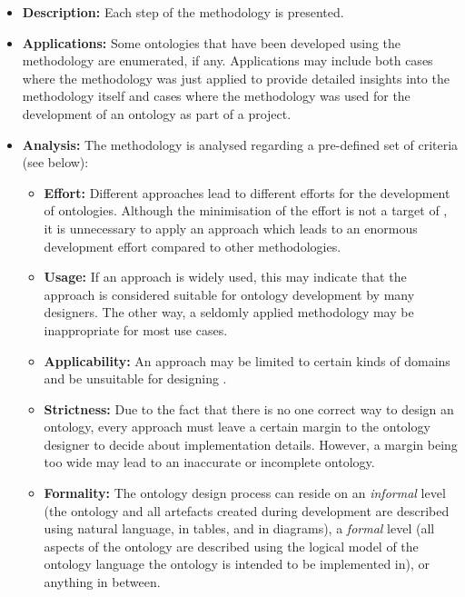 \begin{itemize}
  \item \textbf{Description:} Each step of the methodology is presented.
  
  \item \textbf{Applications:} Some ontologies that have been developed using the methodology are enumerated, if any. Applications may include both cases where the methodology was just applied to provide detailed insights into the methodology itself and cases where the methodology was used for the development of an ontology as part of a project.
  
  \item \textbf{Analysis:} The methodology is analysed regarding a pre-defined set of criteria (see below):
    \begin{itemize}
      \item \textbf{Effort:} Different approaches lead to different efforts for the development of ontologies. Although the minimisation of the effort is not a target of \thinkhomeweather, it is unnecessary to apply an approach which leads to an enormous development effort compared to other methodologies.
      
      \item \textbf{Usage:} If an approach is widely used, this may indicate that the approach is considered suitable for ontology development by many designers. The other way, a seldomly applied methodology may be inappropriate for most use cases.
      
      \item \textbf{Applicability:} An approach may be limited to certain kinds of domains and be unsuitable for designing \thinkhomeweather.
      
      \item \textbf{Strictness:} Due to the fact that there is no one correct way to design an ontology, every approach must leave a certain margin to the ontology designer to decide about implementation details. However, a margin being too wide may lead to an inaccurate or incomplete ontology.
      
      \item \textbf{Formality:} The ontology design process can reside on an \emph{informal} level (the ontology and all artefacts created during development are described using natural language, in tables, and in diagrams), a \emph{formal} level (all aspects of the ontology are described using the logical model of the ontology language the ontology is intended to be implemented in), or anything in between.
      

\end{itemize}
\end{itemize}

